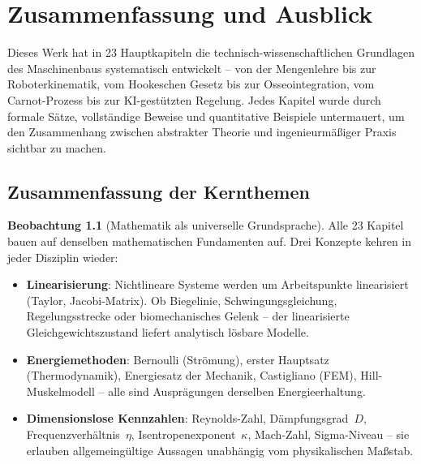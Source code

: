 ﻿\documentclass[a4paper,12pt]{report}
\theoremstyle{definition}
\newtheorem{beobachtung}{Beobachtung}
\begin{document}
\chapter{Zusammenfassung und Ausblick}

Dieses Werk hat in 23 Hauptkapiteln die technisch-wissenschaftlichen
Grundlagen des Maschinenbaus systematisch entwickelt -- von der
Mengenlehre bis zur Roboterkinematik, vom Hookeschen Gesetz bis zur
Osseointegration, vom Carnot-Prozess bis zur KI-gestützten Regelung.
Jedes Kapitel wurde durch formale Sätze, vollständige Beweise und
quantitative Beispiele untermauert, um den Zusammenhang zwischen
abstrakter Theorie und ingenieurmäßiger Praxis sichtbar zu machen.

\section{Zusammenfassung der Kernthemen}

\begin{beobachtung}[Mathematik als universelle Grundsprache]
Alle 23 Kapitel bauen auf denselben mathematischen Fundamenten auf.
Drei Konzepte kehren in jeder Disziplin wieder:
\begin{itemize}
    \item[-] \textbf{Linearisierung}: Nichtlineare Systeme werden um
          Arbeitspunkte linearisiert (Taylor, Jacobi-Matrix).
          Ob Biegelinie, Schwingungsgleichung, Regelungsstrecke oder
          biomechanisches Gelenk -- der linearisierte Gleichgewichtszustand
          liefert analytisch lösbare Modelle.
    \item[-] \textbf{Energiemethoden}: Bernoulli (Strömung), erster Hauptsatz
          (Thermodynamik), Energiesatz der Mechanik, Castigliano (FEM),
          Hill-Muskelmodell -- alle sind Ausprägungen derselben Energieerhaltung.
    \item[-] \textbf{Dimensionslose Kennzahlen}: Reynolds-Zahl, Dämpfungsgrad~$D$,
          Frequenzverhältnis~$\eta$, Isentropenexponent~$\kappa$, Mach-Zahl,
          Sigma-Niveau -- sie erlauben allgemeingültige Aussagen unabhängig
          vom physikalischen Maßstab.
\end{itemize}
\end{beobachtung}
\end{document}
